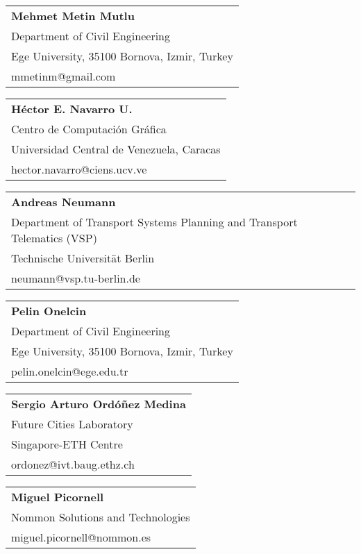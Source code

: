 \begin{tabular}[width=0.48\textwidth]{@{}l}
\textbf{Mehmet Metin Mutlu} \\
Department of Civil Engineering \\
Ege University, 35100 Bornova, Izmir, Turkey \\
mmetinm@gmail.com \\
\end{tabular}

\begin{tabular}[width=0.48\textwidth]{@{}l}
\textbf{Héctor E. Navarro U.} \\
Centro de Computación Gráfica \\
Universidad Central de Venezuela, Caracas \\
hector.navarro@ciens.ucv.ve \\
\end{tabular}

\begin{tabular}[width=0.48\textwidth]{@{}l}
\textbf{Andreas Neumann} \\
Department of Transport Systems Planning and Transport Telematics (VSP) \\
Technische Universität Berlin \\
neumann@vsp.tu-berlin.de \\
\end{tabular}

\begin{tabular}[width=0.48\textwidth]{@{}l}
\textbf{Pelin Onelcin} \\
Department of Civil Engineering \\
Ege University, 35100 Bornova, Izmir, Turkey \\
pelin.onelcin@ege.edu.tr \\
\end{tabular}

\begin{tabular}[width=0.48\textwidth]{@{}l}
\textbf{Sergio Arturo Ordóñez Medina} \\
Future Cities Laboratory \\
Singapore-ETH Centre\\
ordonez@ivt.baug.ethz.ch \\
\end{tabular}

\begin{tabular}[width=0.48\textwidth]{@{}l}
\textbf{Miguel Picornell} \\
Nommon Solutions and Technologies \\
miguel.picornell@nommon.es \\
\end{tabular}

